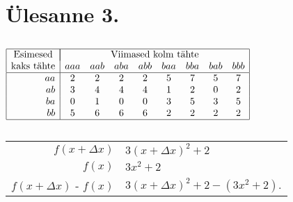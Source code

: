 \section{Ülesanne 3.}


\subsection{}

\begin{center}
  $\begin{array}{ | r | *{8}{c} | }
    \hline
    \multicolumn{1}{|c|}{\text{Esimesed}} & \multicolumn{8}{|c|}{\text{Viimased kolm tähte}} \\
    \text{kaks tähte} & aaa & aab & aba & abb & baa & bba & bab & bbb \\ \hline
    aa & 2 & 2 & 2 & 2 & 5 & 7 & 5 & 7 \\
    ab & 3 & 4 & 4 & 4 & 1 & 2 & 0 & 2 \\
    ba & 0 & 1 & 0 & 0 & 3 & 5 & 3 & 5 \\
    bb & 5 & 6 & 6 & 6 & 2 & 2 & 2 & 2 \\
    \hline
  \end{array}$
\end{center}

\subsection{}

\begin{center}
  \begin{tabular}{ r @{ $=$ } l }
					   $f(x+\Delta x)$ & $3(x + \Delta x)^2 + 2$ \\
					            $f(x)$ & $3x^2  + 2$ \\
    \hline
    $f(x+\Delta x)$ - $f(x)$ & $3(x + \Delta x)^2 + 2 - (3x^2  + 2)$.
  \end{tabular}
\end{center}
